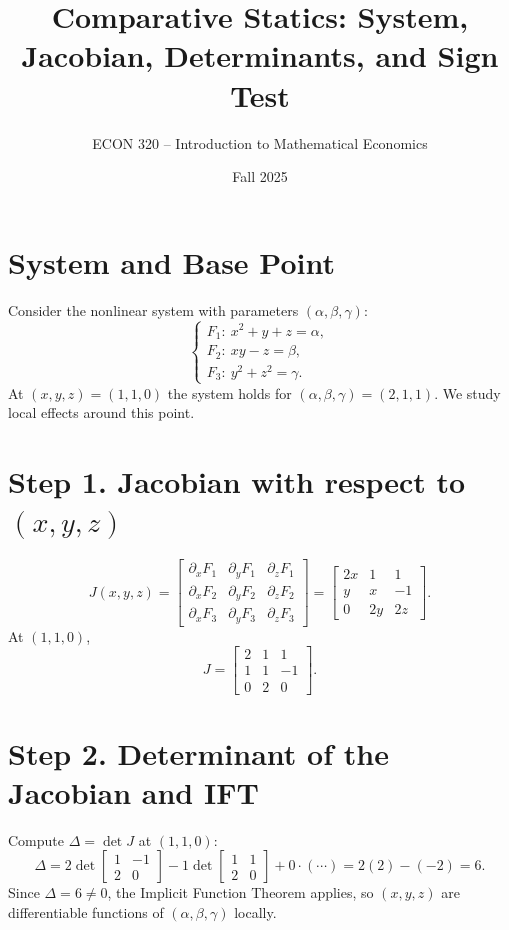 \documentclass[12pt]{article}
\title{Comparative Statics: System, Jacobian, Determinants, and Sign Test}
\author{ECON 320 -- Introduction to Mathematical Economics}
\date{Fall 2025}
\begin{document}
\maketitle

\section*{System and Base Point}
Consider the nonlinear system with parameters $(\alpha,\beta,\gamma)$:
\[
\begin{cases}
F_1:\ x^2 + y + z = \alpha,\\
F_2:\ xy - z = \beta,\\
F_3:\ y^2 + z^2 = \gamma.
\end{cases}
\]
At $(x,y,z)=(1,1,0)$ the system holds for $(\alpha,\beta,\gamma)=(2,1,1)$. We study local effects around this point.

\section*{Step 1. Jacobian with respect to $(x,y,z)$}
\[
J(x,y,z)=
\begin{bmatrix}
\partial_x F_1 & \partial_y F_1 & \partial_z F_1\\
\partial_x F_2 & \partial_y F_2 & \partial_z F_2\\
\partial_x F_3 & \partial_y F_3 & \partial_z F_3
\end{bmatrix}
=
\begin{bmatrix}
2x & 1 & 1\\
y  & x & -1\\
0  & 2y & 2z
\end{bmatrix}.
\]
At $(1,1,0)$,
\[
J=
\begin{bmatrix}
2 & 1 & 1\\
1 & 1 & -1\\
0 & 2 & 0
\end{bmatrix}.
\]

\section*{Step 2. Determinant of the Jacobian and IFT}
Compute $\Delta=\det J$ at $(1,1,0)$:
\[
\Delta
=2\det\!\begin{bmatrix}1&-1\\ 2&0\end{bmatrix}
-1\det\!\begin{bmatrix}1&1\\ 2&0\end{bmatrix}
+0\cdot(\cdots)
=2(2)-(-2)=6.
\]
Since $\Delta=6\neq 0$, the Implicit Function Theorem applies, so $(x,y,z)$ are differentiable functions of $(\alpha,\beta,\gamma)$ locally.
\end{document}
